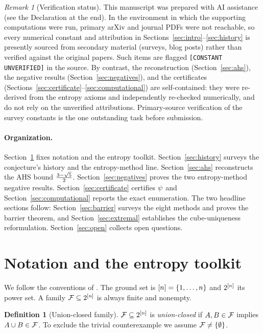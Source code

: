 \documentclass[11pt]{amsart}
\theoremstyle{definition}
\newtheorem{definition}[theorem]{Definition}
\theoremstyle{remark}
\newtheorem{remark}[theorem]{Remark}
\begin{document}
\begin{remark}[Verification status]\label{rmk:verif}
This manuscript was prepared with AI assistance (see the Declaration at the end).
In the environment in which the supporting computations were run, primary
arXiv and journal PDFs were not reachable, so every numerical constant and
attribution in Sections~\ref{sec:intro}--\ref{sec:history} is presently sourced
from secondary material (surveys, blog posts) rather than verified against the
original papers. Such items are flagged \texttt{[CONSTANT UNVERIFIED]} in the
source. By contrast, the reconstruction (Section~\ref{sec:ahs}), the negative
results (Section~\ref{sec:negatives}), and the certificates
(Sections~\ref{sec:certificate}--\ref{sec:computational}) are self-contained:
they were re-derived from the entropy axioms and independently re-checked
numerically, and do not rely on the unverified attributions. Primary-source
verification of the survey constants is the one outstanding task before
submission.
\end{remark}

\paragraph{Organization.}
Section~\ref{sec:notation} fixes notation and the entropy toolkit.
Section~\ref{sec:history} surveys the conjecture's history and the entropy-method
line. Section~\ref{sec:ahs} reconstructs the AHS bound $\tfrac{3-\sqrt{5}}{2}$.
Section~\ref{sec:negatives} proves the two entropy-method negative results.
Section~\ref{sec:certificate} certifies $\psi$ and
Section~\ref{sec:computational} reports the exact enumeration. The two headline
sections follow: Section~\ref{sec:barrier} surveys the eight methods and proves
the barrier theorem, and Section~\ref{sec:extremal} establishes the
cube-uniqueness reformulation. Section~\ref{sec:open} collects open questions.

\section{Notation and the entropy toolkit}
\label{sec:notation}

We follow the conventions of \cite{gilmer2022,ahs2023}. The ground set is
$[n]=\{1,\dots,n\}$ and $2^{[n]}$ its power set. A family
$\mathcal{F}\subseteq2^{[n]}$ is always finite and nonempty.

\begin{definition}[Union-closed family]\label{def:uc}
$\mathcal{F}\subseteq2^{[n]}$ is \emph{union-closed} if $A,B\in\mathcal{F}$ implies
$A\cup B\in\mathcal{F}$. To exclude the trivial counterexample we assume
$\mathcal{F}\neq\{\emptyset\}$.
\end{definition}
\end{document}
